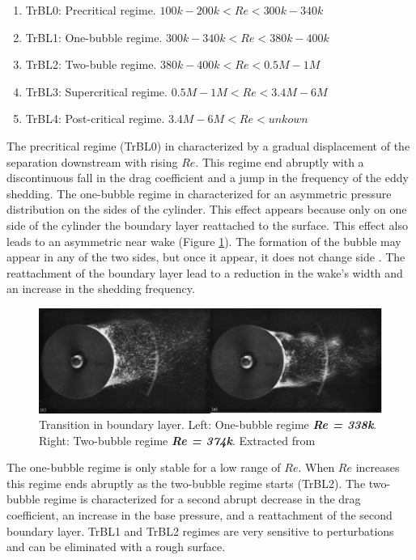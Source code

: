 \documentclass[journal]{new-aiaa}
\begin{document}
\begin{enumerate}[label=(\roman*)]
\item TrBL0: Precritical regime. $100k-200k<Re<300k-340k$
\item TrBL1: One-bubble regime. $300k-340k<Re<380k-400k$
\item TrBL2: Two-buble regime. $380k-400k<Re<0.5M-1M$
\item TrBL3: Supercritical regime. $0.5M-1M<Re<3.4M-6M$
\item TrBL4: Post-critical regime. $3.4M-6M<Re<unkown$
\end{enumerate}

The precritical regime (TrBL0) in characterized by a gradual displacement of the separation downstream with rising $Re$. This regime end abruptly with a discontinuous fall in the drag coefficient and a jump in the frequency of the eddy shedding. The one-bubble regime in characterized for an asymmetric pressure distribution on the sides of the cylinder. This effect appears because only on one side of the cylinder the boundary layer reattached to the surface. This effect also leads to an asymmetric near wake (Figure \ref{fig:TrBL}). The formation of the bubble may appear in any of the two sides, but once it appear, it does not change side \citep{Zdravkovich1997}. The reattachment of the boundary layer lead to a reduction in the wake's width and an increase in the shedding frequency.


\begin{figure}[H]
\begin{center}
\includegraphics[width=1\textwidth]{Images/federico/Figure06}
\caption{Transition in boundary layer. Left: One-bubble regime \textbf{\textit{Re = 338k}}. Right: Two-bubble regime \textbf{\textit{Re = 374k}}. Extracted from \cite{Almosnino1984}}
\label{fig:TrBL}
\end{center}
\end{figure}


The one-bubble regime is only stable for a low range of $Re$. When $Re$ increases this regime ends abruptly as the two-bubble regime starts (TrBL2). The two-bubble regime is characterized for a second abrupt decrease in the drag coefficient, an increase in the base pressure, and a reattachment of the second boundary layer. TrBL1 and TrBL2  regimes are very sensitive to perturbations and can be eliminated with a rough surface.
\end{document}
